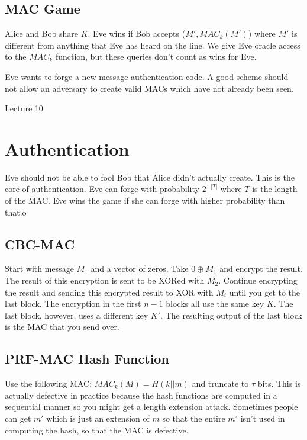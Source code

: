 \documentclass[psamsfonts]{amsart}
\begin{document}
\subsection{MAC Game}

Alice and Bob share $K$. Eve wins if Bob accepts ($M', MAC_{k}(M')$) where $M'$ is different from anything that Eve has heard on the line. We give Eve oracle access to the $MAC_{k}$ function, but these queries don't count as wins for Eve.

Eve wants to forge a new message authentication code. A good scheme should not allow an adversary to create valid MACs which have not already been seen.


\newpage
\Large{Lecture 10}


\maketitle

\section{Authentication}

Eve should not be able to fool Bob that Alice didn't actually create. This is the core of authentication. Eve can forge with probability $2^{-|T|}$ where $T$ is the length of the MAC. Eve wins the game if she can forge with higher probability than that.o

\subsection{CBC-MAC}

Start with message $M_1$ and a vector of zeros. Take $0 \oplus M_1$ and encrypt the result. The result of this encryption is sent to be XORed with $M_2$. Continue encrypting the result and sending this encrypted result to XOR with $M_i$ until you get to the last block. The encryption in the first $n-1$ blocks all use the same key $K$. The last block, however, uses a different key $K'$. The resulting output of the last block is the MAC that you send over.

\subsection{PRF-MAC Hash Function}

Use the following MAC: $MAC_{k}(M) = H(k || m)$ and truncate to $\tau$ bits. This is actually defective in practice because the hash functions are computed in a sequential manner so you might get a length extension attack. Sometimes people can get $m'$ which is just an extension of $m$ so that the entire $m'$ isn't used in computing the hash, so that the MAC is defective.
\end{document}

